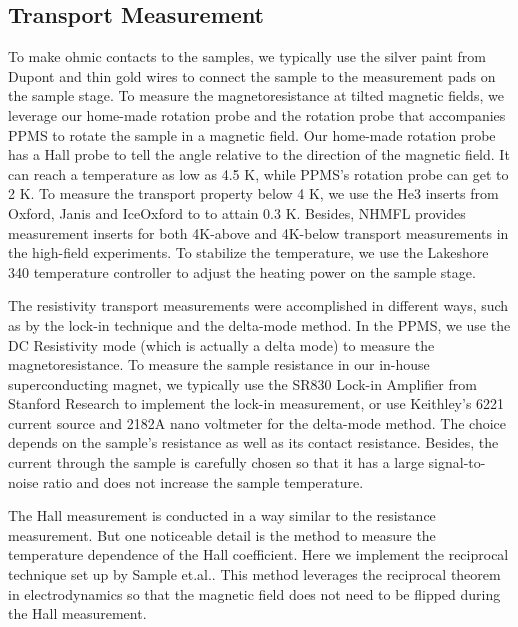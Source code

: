 \subsection{Transport Measurement}\label{transport}

To make ohmic contacts to the samples, we typically use the silver paint from Dupont and thin gold wires to connect the sample to the measurement pads on the sample stage. To measure the magnetoresistance at tilted magnetic fields, we leverage our home-made rotation probe and the rotation probe that accompanies PPMS to rotate the sample in a magnetic field. Our home-made rotation probe has a Hall probe to tell the angle relative to the direction of the magnetic field. It can reach a temperature as low as 4.5 K, while PPMS's rotation probe can get to 2 K. To measure the transport property below 4 K, we use the He3 inserts from Oxford, Janis and IceOxford to to attain 0.3 K. Besides, NHMFL provides measurement inserts for both 4K-above and 4K-below transport measurements in the high-field experiments. To stabilize the temperature, we use the Lakeshore 340 temperature controller to adjust the heating power on the sample stage. 

The resistivity transport measurements were accomplished in different ways, such as by the lock-in technique and the delta-mode method. In the PPMS, we use the DC Resistivity mode (which is actually a delta mode) to measure the magnetoresistance. To measure the sample resistance in our in-house superconducting magnet, we typically use the SR830 Lock-in Amplifier from Stanford Research to implement the lock-in measurement, or use Keithley's 6221 current source and 2182A nano voltmeter for the delta-mode method. The choice depends on the sample's resistance as well as its contact resistance. Besides, the current through the sample is carefully chosen so that it has a large signal-to-noise ratio and does not increase the sample temperature. 

The Hall measurement is conducted in a way similar to the resistance measurement. But one noticeable detail is the method to measure the temperature dependence of the Hall coefficient. Here we implement the reciprocal technique set up by Sample et.al.\cite{Sample1987}. This method leverages the reciprocal theorem in electrodynamics so that the magnetic field does not need to be flipped during the Hall measurement. 

